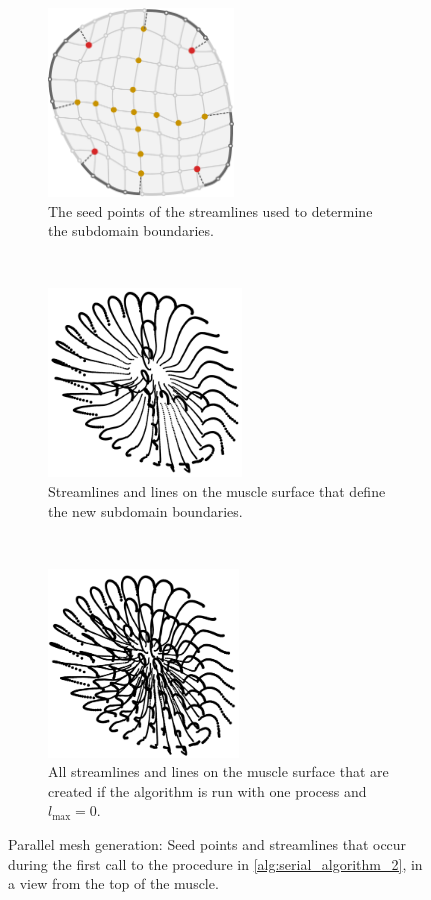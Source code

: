 \begin{figure}
  \centering
  \begin{subfigure}[t]{0.30\textwidth}%
    \centering%
    \includegraphics[height=5cm]{images/parallel_fiber_estimation/fixed_0.pdf}
    \caption{The seed points of the streamlines used to determine the subdomain boundaries. }%
    \label{fig:seed_points_to_send_1}%
  \end{subfigure}
  \,
  \begin{subfigure}[t]{0.30\textwidth}%
    \centering%
    \includegraphics[height=5cm]{images/parallel_fiber_estimation/fixed_1.png}
    \caption{Streamlines and lines on the muscle surface that define the new subdomain boundaries.}%
    \label{fig:fixed_1}%
  \end{subfigure}
  \,
  \begin{subfigure}[t]{0.30\textwidth}%
    \centering%
    \includegraphics[height=5cm]{images/parallel_fiber_estimation/final_interior_1.png}
    \caption{All streamlines and lines on the muscle surface that are created if the algorithm is run with one process and $l_\text{max}=0$.}%
    \label{fig:final_interior_1}%
  \end{subfigure}
  \caption{Parallel mesh generation: Seed points and streamlines that occur during the first call to the procedure in \cref{alg:serial_algorithm_2}, in a view from the top of the muscle.}
  \label{fig:seed_points}%
\end{figure}

